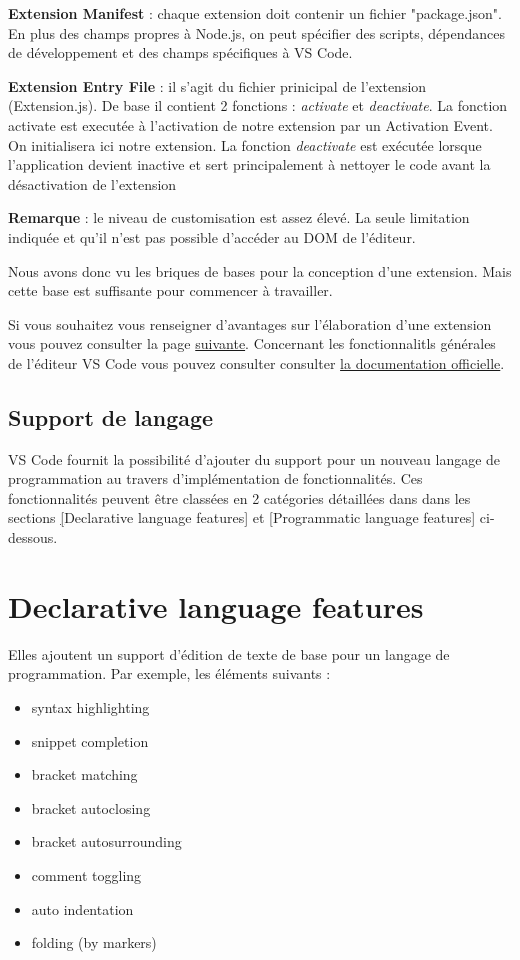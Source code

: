 \documentclass[
    iict, %
    il, %
]{heig-tb}
\begin{document}
\textbf{Extension Manifest} :
chaque extension doit contenir un fichier "package.json". En plus des champs propres à Node.js, on peut spécifier des scripts, dépendances de développement et des champs spécifiques à VS Code.

\textbf{Extension Entry File} :
il s'agit du fichier prinicipal de l'extension (Extension.js).
De base il contient 2 fonctions : \emph{activate} et \emph{deactivate}.
La fonction activate est executée à l'activation de notre extension par un Activation Event. On initialisera ici notre extension.
La fonction \emph{deactivate} est exécutée lorsque l'application devient inactive et sert principalement à nettoyer le code avant la désactivation de l'extension

\textbf{Remarque} : le niveau de customisation est assez élevé. La seule limitation indiquée et qu'il n'est pas possible d'accéder au DOM de l'éditeur.

Nous avons donc vu les briques de bases pour la conception d'une extension. Mais cette base est suffisante pour commencer à travailler.

Si vous souhaitez vous renseigner d'avantages sur l'élaboration d'une extension vous pouvez consulter la page \href{https://code.visualstudio.com/api}{suivante}.
Concernant les fonctionnalitls générales de l'éditeur VS Code vous pouvez consulter consulter \href{https://code.visualstudio.com/docs}{la documentation officielle}.

\subsection{Support de langage}
VS Code fournit la possibilité d'ajouter du support pour un nouveau langage de programmation au travers d'implémentation de fonctionnalités. Ces fonctionnalités peuvent être classées en 2 catégories détaillées
dans dans les sections \hyperref[Declarative language features][Declarative language features] et \hyperref[Programmatic language features][Programmatic language features] ci-dessous.

\section{Declarative language features}\label{Declarative language features}
Elles ajoutent un support d'édition de texte de base pour un langage de programmation.
Par exemple, les éléments suivants :

\begin{itemize}
    \item syntax highlighting
    \item snippet completion
    \item bracket matching
    \item bracket autoclosing
    \item bracket autosurrounding
    \item comment toggling
    \item auto indentation
    \item folding (by markers)
\end{itemize}
\end{document}
